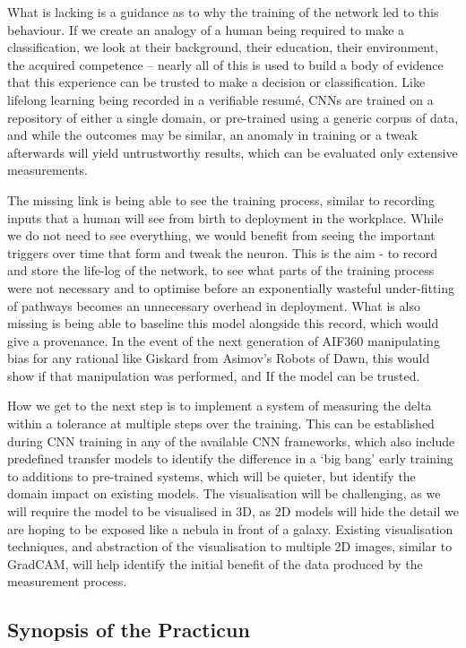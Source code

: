 What is lacking is a guidance as to why the training of the network led to this behaviour. If we create an analogy of a human being required to make a classification, we look at their background, their education, their environment, the acquired competence – nearly all of this is used to build a body of evidence that this experience can be trusted to make a decision or classification. Like lifelong learning being recorded in a verifiable resumé, CNNs are trained on a repository of either a single domain, or pre-trained using a generic corpus of data, and while the outcomes may be similar, an anomaly in training or a tweak afterwards will yield untrustworthy results, which can be evaluated only extensive measurements.

The missing link is being able to see the training process, similar to recording inputs that a human will see from birth to deployment in the workplace. While we do not need to see everything, we would benefit from seeing the important triggers over time that form and tweak the neuron. This is the aim - to record and store the life-log of the network, to see what parts of the training process were not necessary and to optimise before an exponentially wasteful under-fitting of pathways becomes an unnecessary overhead in deployment. What is also missing is being able to baseline this model alongside this record, which would give a provenance. In the event of the next generation of AIF360 manipulating bias for any rational like Giskard from Asimov’s Robots of Dawn, this would show if that manipulation was performed, and If the model can be trusted.

How we get to the next step is to implement a system of measuring the delta within a tolerance at multiple steps over the training. This can be established during CNN training in any of the available CNN frameworks, which also include predefined transfer models to identify the difference in a ‘big bang’ early training to additions to pre-trained systems, which will be quieter, but identify the domain impact on existing models. The visualisation will be challenging, as we will require the model to be visualised in 3D, as 2D models will hide the detail we are hoping to be exposed like a nebula in front of a galaxy. Existing visualisation techniques, and abstraction of the visualisation to multiple 2D images, similar to GradCAM, will help identify the initial benefit of the data produced by the measurement process.


\subsection{Synopsis  of the Practicun}

